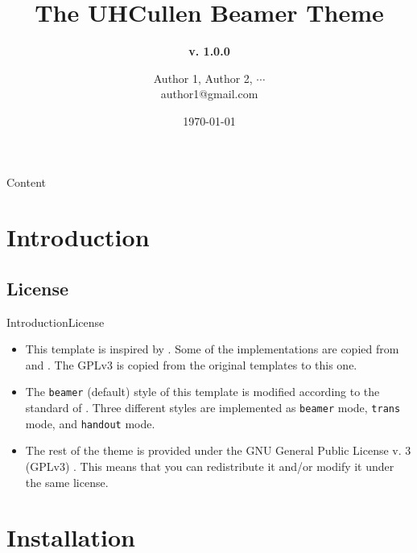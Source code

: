 \documentclass[10pt,xcolor={dvipsnames},aspectratio=169]{beamer}
\title[UHCullen Theme]
{ %
  \textbf{The UHCullen Beamer Theme}
}
\subtitle[v. 1.0.0]
{
\textbf{v. 1.0.0}
}
\author[Author 1]
{Author 1\texorpdfstring{\footnotemark[1]}{},
Author 2\texorpdfstring{\footnotemark[2]}{},
\texorpdfstring{$\cdots$}{...}
\texorpdfstring{ \\
  {\ttfamily author1@gmail.com}
}{}}
\institute[]
{%
  \footnotemark[1]Affiliation 1\\
  \footnotemark[2]Affiliation 2
}
\date{\today} %
\begin{document}

\titleframe

\begin{frame}{Content}{}
\tableofcontents
\end{frame}

\section{Introduction}
\subsection{License}
\begin{frame}{Introduction}{License}

  \begin{itemize}
    \item<1-> This template is inspired by . Some of the implementations are copied from  and . The GPLv3 is copied from the original templates to this one.
    \item<2-> The \texttt{beamer} (default) style of this template is modified according to the standard of . Three different styles are implemented as \texttt{beamer} mode, \texttt{trans} mode, and \texttt{handout} mode.
    \item<3-> The rest of the theme is provided under the GNU General Public License v. 3 (GPLv3) . This means that you can redistribute it and/or modify it under the same license. 
  \end{itemize}
\end{frame}

\section{Installation}
\end{document}
